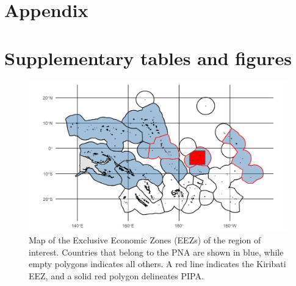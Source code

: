 \documentclass[9p,twocolumn,twoside,lineno]{pnas-new}
\begin{document}
\clearpage

\onecolumn

\FloatBarrier

\section{Appendix}\label{appendix}

\newcommand{\beginsupplement}{\setcounter{table}{0}  \renewcommand{\thetable}{S\arabic{table}} \setcounter{figure}{0} \renewcommand{\thefigure}{S\arabic{figure}}}

\setcounter{table}{0}  \renewcommand{\thetable}{S\arabic{table}} \setcounter{figure}{0} \renewcommand{\thefigure}{S\arabic{figure}}

\section{Supplementary tables and figures}

\clearpage



\clearpage



\clearpage

\begin{figure}
\centering
\includegraphics{img/PNA_map.png}
\caption{\label{fig:PNA_map}Map of the Exclusive Economic Zones (EEZs) of the region of interest. Countries that belong to the PNA are shown in blue, while empty polygons indicates all others. A red line indicates the Kiribati EEZ, and a solid red polygon delineates PIPA.}
\end{figure}

\clearpage
\end{document}
